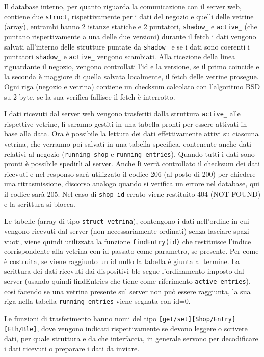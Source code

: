 Il database interno, per quanto riguarda la comunicazione con il server web, contiene due \texttt{struct}, rispettivamente per i dati del negozio e quelli delle vetrine (array), entrambi hanno 2 istanze statiche e 2 puntatori, \texttt{shadow\_} e \texttt{active\_} (che puntano rispettivamente a una delle due versioni) durante il fetch i dati vengono salvati all'interno delle strutture puntate da \texttt{shadow\_} e se i dati sono coerenti i puntatori \texttt{shadow\_} e \texttt{active\_} vengono scambiati. Alla ricezione della linea riguardante il negozio, vengono controllati l'id e la versione, se il primo coincide e la seconda \`e maggiore di quella salvata localmente, il fetch delle vetrine prosegue. Ogni riga (negozio e vetrina) contiene un checksum calcolato con l'algoritmo BSD su 2 byte, se la sua verifica fallisce il fetch \`e interrotto.

I dati ricevuti dal server web vengono trasferiti dalla struttura \texttt{active\_} alle rispettive vetrine, l\`i saranno gestiti in una tabella pronti per essere attivati in base alla data. Ora \`e possibile la lettura dei dati effettivamente attivi su ciascuna vetrina, che verranno poi salvati in una tabella specifica, contenente anche dati relativi al negozio (\texttt{running\_shop} e \texttt{running\_entries}). Quando tutti i dati sono pronti \`e possibile spedirli al server. Anche l\`i verr\`a controllato il checksum dei dati ricevuti e nel responso sar\`a utilizzato il codice 206 (al posto di 200) per chiedere una ritrasmissione, discorso analogo quando si verifica un errore nel database, qui il codice sar\`a 205. Nel caso di \texttt{shop\_id} errato viene restituito 404 (NOT FOUND) e la scrittura si blocca.

Le tabelle (array di tipo \texttt{struct vetrina}), contengono i dati nell'ordine in cui vengono ricevuti dal server (non necessariamente ordinati) senza lasciare spazi vuoti, viene quindi utilizzata la funzione \texttt{findEntry(id)} che restituisce l'indice corrispondente alla vetrina con id passato come parametro, se presente. Per come \`e costruita, se viene raggiunto un id nullo la tabella \`e giunta al termine. La scrittura dei dati ricevuti dai dispositivi ble segue l'ordinamento imposto dal server (usando quindi findEntries che tiene come riferimento \texttt{active\_entries}), cos\`i facendo se una vetrina presente sul server non pu\`o essere raggiunta, la sua riga nella tabella \texttt{running\_entries} viene segnata con id=0.

Le funzioni di trasferimento hanno nomi del tipo \texttt{[get/set][Shop/Entry][Eth/Ble]}, dove vengono indicati rispettivamente se devono leggere o scrivere dati, per quale struttura e da che interfaccia, in generale servono per decodificare i dati ricevuti o preparare i dati da inviare.

